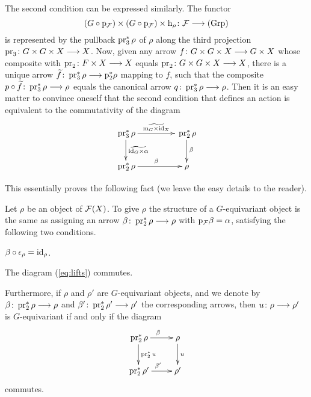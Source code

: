 \begin{3   FIBERED CATEGORIES}
\begin{3.8 Equivariant objects in fibcats}
The second condition can be expressed similarly. The functor
   \[
   (G \circ \p_{\cF}) \times (G \circ \p_{\cF}) \times \h_{\rho} \colon \cF 
   \arr \catgrp
   \]
is represented by the pullback $\operatorname{pr}_{3}^{*}\rho$ of $\rho$ along the third projection $\pr_{3} \colon G \times G \times X \arr X$. Now, given any arrow $f \colon G \times G \times X \arr G \times X$ whose composite with $\pr_{2}\colon F \times X \arr X$ equals $\pr_{2}\colon G \times G \times X \arr X$, there is a unique arrow $\widetilde{f} \colon \pr_{3}^{*}\rho \arr \p_{2}^{*}\rho$ mapping to $f$, such that the composite $p \circ \widetilde{f} \colon  \pr_{3}^{*}\rho \arr \rho$ equals the canonical arrow $q \colon \pr_{3}^{*}\rho \arr \rho$. Then it is an easy matter to convince oneself that the second condition that defines an action is equivalent to the commutativity of the diagram
   \begin{equation}\label{eq:lifts}
   \xymatrix@C+20pt{
   {}\pr_{3}^{*}\rho \ar[r]^{\widetilde{\mul_{G}\times \id_{X}}}
      \ar[d]^{\widetilde{\id_{G}\times \alpha}} &
   {}\pr_{2}^{*}\rho \ar[d]^{\beta}\\
   {}\pr_{2}^{*}\rho \ar[r]^{\beta}&
   {}\rho
   }
   \end{equation}

This essentially proves the following fact (we leave the easy details to the reader).

\begin{proposition}
Let $\rho$ be an object of $\mathcal{F}(X)$. To give $\rho$ the structure of a  $G$-equivariant object is the same as assigning an arrow $\beta \colon  \pr_{2}^{*}\rho \arr \rho$ with $\mathrm{p}_{\mathcal{F}}\beta = \alpha$, satisfying the following two conditions.
\begin{enumeratei}

\item $\beta \circ \epsilon_{\rho} = \mathrm{id}_{\rho}$.

\item The diagram (\ref{eq:lifts}) commutes.

\end{enumeratei}

Furthermore, if $\rho$ and $\rho'$ are $G$-equivariant objects, and we denote by $\beta \colon \pr_{2}^{*}\rho \arr \rho$ and $\beta' \colon \pr_{2}^{*}\rho' \arr \rho'$ the corresponding arrows, then $u \colon \rho \arr \rho'$ is $G$-equivariant if and only if the diagram
   \[
   \xymatrix{
   {}\pr_{2}^{*}\rho \ar[r]^{\beta} \ar[d]^{\pr_{2}^{*}u}&
   \rho              \ar[d]^{u}  \\
   {}\pr_{2}^{*}\rho' \ar[r]^{\beta'}&
   \rho'
   }
   \]
commutes.


\end{proposition}
\end{3.8 Equivariant objects in fibcats}
\end{3   FIBERED CATEGORIES}
